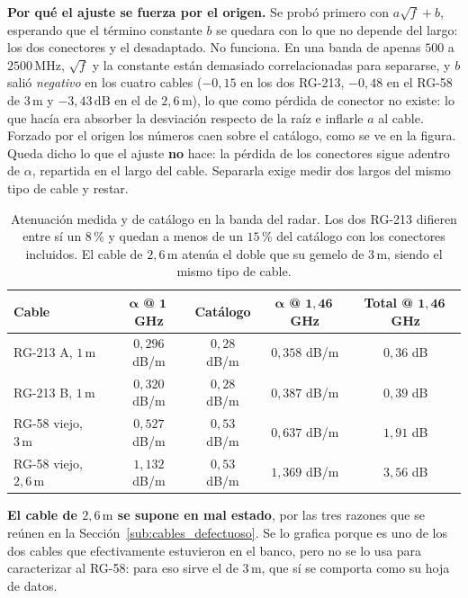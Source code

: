 \documentclass[12pt, a4paper, twoside]{report}
\begin{document}
\textbf{Por qué el ajuste se fuerza por el origen.} Se probó primero
con $a\sqrt{f} + b$, esperando que el término constante $b$ se quedara
con lo que no depende del largo: los dos conectores y el desadaptado.
No funciona. En una banda de apenas $500$ a $2500\,\text{MHz}$,
$\sqrt{f}$ y la constante están demasiado correlacionadas para
separarse, y $b$ salió \emph{negativo} en los cuatro cables
($-0{,}15$ en los dos RG-213, $-0{,}48$ en el RG-58 de $3\,\text{m}$ y
$-3{,}43\,\text{dB}$ en el de $2{,}6\,\text{m}$), lo que como pérdida de conector no
existe: lo que hacía era absorber la desviación respecto de la raíz e
inflarle $a$ al cable. Forzado por el origen los números caen sobre el
catálogo, como se ve en la figura. Queda dicho lo que el ajuste
\textbf{no} hace: la pérdida de los conectores sigue adentro de
$\alpha$, repartida en el largo del cable. Separarla exige medir dos
largos del mismo tipo de cable y restar.

\begin{table}[H]
  \centering
  \caption{Atenuación medida y de catálogo en la banda del radar. Los
    dos RG-213 difieren entre sí un $8$\,\% y quedan a menos de un
    $15$\,\% del catálogo con los conectores incluidos. El cable de
    $2{,}6\,\text{m}$ atenúa el doble que su gemelo de $3\,\text{m}$,
    siendo el mismo tipo de cable.}
  \label{tab:cables_alfa}
  \begin{tabular}{lcccc}
    \toprule
    \textbf{Cable} & $\bm{\alpha}$ \textbf{@} $\bm{1\,}$\textbf{GHz}
    & \textbf{Catálogo} & $\bm{\alpha}$ \textbf{@} $\bm{1{,}46\,}$\textbf{GHz}
    & \textbf{Total @} $\bm{1{,}46\,}$\textbf{GHz} \\
    \midrule
    RG-213 A, $1\,\text{m}$          & $0{,}296$ dB/m & $0{,}28$ dB/m & $0{,}358$ dB/m & $0{,}36$ dB \\
    RG-213 B, $1\,\text{m}$          & $0{,}320$ dB/m & $0{,}28$ dB/m & $0{,}387$ dB/m & $0{,}39$ dB \\
    RG-58 viejo, $3\,\text{m}$       & $0{,}527$ dB/m & $0{,}53$ dB/m & $0{,}637$ dB/m & $1{,}91$ dB \\
    RG-58 viejo, $2{,}6\,\text{m}$   & $1{,}132$ dB/m & $0{,}53$ dB/m & $1{,}369$ dB/m & $3{,}56$ dB \\
    \bottomrule
  \end{tabular}
\end{table}

\textbf{El cable de $2{,}6\,\text{m}$ se supone en mal estado}, por las
tres razones que se reúnen en la Sección~\ref{sub:cables_defectuoso}.
Se lo grafica porque es uno de los dos cables que efectivamente
estuvieron en el banco, pero no se lo usa para caracterizar al RG-58:
para eso sirve el de $3\,\text{m}$, que sí se comporta como su hoja de
datos.
\end{document}
